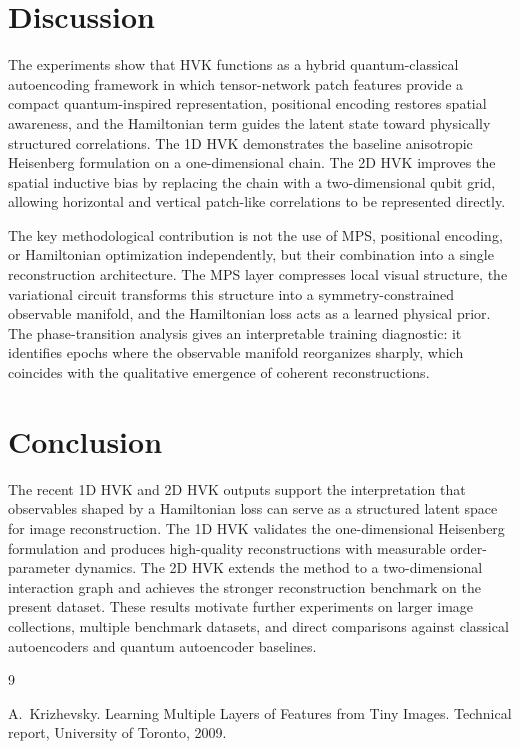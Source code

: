 \documentclass[11pt]{article}
\begin{document}
\section{Discussion}

The experiments show that HVK functions as a hybrid quantum-classical autoencoding framework in which tensor-network patch features provide a compact quantum-inspired representation, positional encoding restores spatial awareness, and the Hamiltonian term guides the latent state toward physically structured correlations. The 1D HVK demonstrates the baseline anisotropic Heisenberg formulation on a one-dimensional chain. The 2D HVK improves the spatial inductive bias by replacing the chain with a two-dimensional qubit grid, allowing horizontal and vertical patch-like correlations to be represented directly.

The key methodological contribution is not the use of MPS, positional encoding, or Hamiltonian optimization independently, but their combination into a single reconstruction architecture. The MPS layer compresses local visual structure, the variational circuit transforms this structure into a symmetry-constrained observable manifold, and the Hamiltonian loss acts as a learned physical prior. The phase-transition analysis gives an interpretable training diagnostic: it identifies epochs where the observable manifold reorganizes sharply, which coincides with the qualitative emergence of coherent reconstructions.

\section{Conclusion}

The recent 1D HVK and 2D HVK outputs support the interpretation that observables shaped by a Hamiltonian loss can serve as a structured latent space for image reconstruction. The 1D HVK validates the one-dimensional Heisenberg formulation and produces high-quality reconstructions with measurable order-parameter dynamics. The 2D HVK extends the method to a two-dimensional interaction graph and achieves the stronger reconstruction benchmark on the present dataset. These results motivate further experiments on larger image collections, multiple benchmark datasets, and direct comparisons against classical autoencoders and quantum autoencoder baselines.

\begin{thebibliography}{9}

A.~Krizhevsky.
\newblock Learning Multiple Layers of Features from Tiny Images.
\newblock Technical report, University of Toronto, 2009.

\end{thebibliography}
\end{document}
